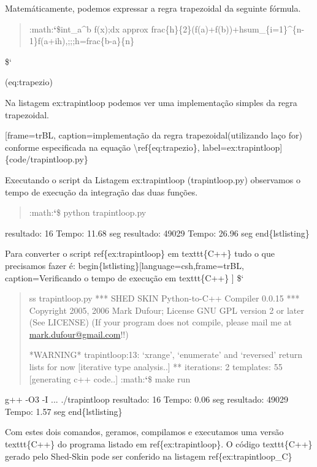 \documentclass[a4paper,10pt,brazil]{sphinxmanual}
\begin{document}
Matemáticamente, podemos expressar a regra trapezoidal da seguinte
fórmula.
\begin{quote}

:math:{\color{red}\bfseries{}{}`}\$int\_a\textasciicircum{}b f(x);dx approx frac\{h\}\{2\}(f(a)+f(b))+hsum\_\{i=1\}\textasciicircum{}\{n-1\}f(a+ih),;;;h=frac\{b-a\}\{n\}
\end{quote}

\${}`

(eq:trapezio)

Na listagem ex:trapintloop podemos ver uma implementação simples da
regra trapezoidal.

{[}frame=trBL, caption=implementação  da regra trapezoidal(utilizando laço for) conforme especificada na equação \textbackslash{}ref\{eq:trapezio\}, label=ex:trapintloop{]} \{code/trapintloop.py\}

Executando o script da Listagem ex:trapintloop (trapintloop.py)
observamos o tempo de execução da integração das duas funções.
\begin{quote}

:math:{\color{red}\bfseries{}{}`}\$ python trapintloop.py
\end{quote}

resultado: 16
Tempo: 11.68 seg
resultado: 49029
Tempo: 26.96 seg
end\{lstlisting\}

Para converter o script ref\{ex:trapintloop\} em texttt\{C++\} tudo o que precisamos fazer é:
begin\{lstlisting\}{[}language=csh,frame=trBL, caption=Verificando o tempo de execução em texttt\{C++\} {]}
\${}`
\begin{quote}

ss trapintloop.py *** SHED SKIN Python-to-C++ Compiler 0.0.15
*** Copyright 2005, 2006 Mark Dufour; License GNU GPL version 2
or later (See LICENSE) (If your program does not compile, please
mail me at \href{mailto:mark.dufour@gmail.com}{mark.dufour@gmail.com}!!)

*WARNING* trapintloop:13: `xrange', `enumerate' and `reversed'
return lists for now {[}iterative type analysis..{]} ** iterations: 2
templates: 55 {[}generating c++ code..{]}
:math:{\color{red}\bfseries{}{}`}\$ make run
\end{quote}

g++ -O3  -I ...
./trapintloop
resultado: 16
Tempo: 0.06 seg
resultado: 49029
Tempo: 1.57 seg
end\{lstlisting\}

Com estes dois comandos, geramos, compilamos e executamos uma versão texttt\{C++\} do programa listado em ref\{ex:trapintloop\}. O código texttt\{C++\} gerado pelo Shed-Skin pode ser conferido na listagem ref\{ex:trapintloop\_C\}
\end{document}
